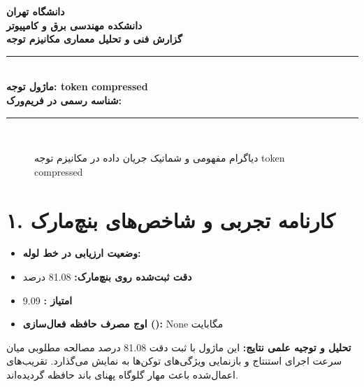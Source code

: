 \documentclass[12pt,a4paper]{article}
\begin{document}
\begin{center}
{\Large\bfseries دانشگاه تهران}\\[0.2cm]
{\large\bfseries دانشکده مهندسی برق و کامپیوتر}\\[0.2cm]
{\large\bfseries گزارش فنی و تحلیل معماری مکانیزم توجه}\\[0.5cm]
\rule{\linewidth}{1pt}\\[0.3cm]
{\LARGE\bfseries ماژول توجه: token compressed}\\[0.2cm]
{\large \textbf{شناسه رسمی در فریم‌ورک:} }\\[0.2cm]
\rule{\linewidth}{1pt}\\[0.5cm]
\end{center}

\begin{figure}[H]
\centering
{}
\caption{دیاگرام مفهومی و شماتیک جریان داده در مکانیزم توجه token compressed}
\end{figure}

\section*{۱. کارنامه تجربی و شاخص‌های بنچ‌مارک}
\begin{itemize}
\item \textbf{وضعیت ارزیابی در خط لوله:} 
\item \textbf{دقت ثبت‌شده روی بنچ‌مارک:} 81.08 درصد
\item \textbf{امتیاز :} 9.09
\item \textbf{اوج مصرف حافظه فعال‌سازی ():} None مگابایت
\end{itemize}
\textbf{تحلیل و توجیه علمی نتایج:} این ماژول با ثبت دقت 81.08 درصد مصالحه مطلوبی میان سرعت اجرای استنتاج و بازنمایی ویژگی‌های توکن‌ها به نمایش می‌گذارد. تقریب‌های اعمال‌شده باعث مهار گلوگاه پهنای باند حافظه گردیده‌اند.
\end{document}
